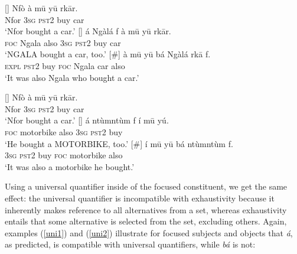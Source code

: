 \documentclass[output=paper,
modfonts
]{langscibook}
\begin{document}
\begin{exe}
\ex
\begin{xlist}
[] {{\label{also1}}
\gll Nf\`o \`a m\=u y\=u rk\=ar. \\
Nfor \textsc{3sg} \textsc{pst2} buy car\\
\glt `Nfor bought a car.'}
[]{ \label{also2}
\gll \'a Ng\`al\'a  f \`a m\=u y\=u rk\=ar. \\
\textsc{foc} Ngala also \textsc{3sg} \textsc{pst2} buy car  \\
\glt `NGALA bought a car, too.'}
[\#] {\label{also3}
\gll \`a m\=u y\=u {b\'a} Ng\`al\'a rk\=a f. \\
 \textsc{expl} \textsc{pst2} buy \textsc{foc} Ngala car also\\
\glt `It was also Ngala who bought a car.'}
\end{xlist}
\end{exe}



\begin{exe}
\ex
\begin{xlist}
[] {\label{also4} 
\gll Nf\`o \`a m\=u y\=u rk\=ar. \\
Nfor \textsc{3sg} \textsc{pst2} buy car\\
\glt `Nfor bought a car.'}
[]{ \label{also5}
\gll \'a nt\`umnt\`um  f \'i m\=u y\'u. \\
\textsc{foc} motorbike also \textsc{3sg} \textsc{pst2} buy  \\
\glt `He bought a MOTORBIKE, too.'}
[\#] {\label{also6}
\gll \'i m\=u y\=u {b\'a} nt\`umnt\`um f. \\
 \textsc{3sg} \textsc{pst2} buy \textsc{foc} motorbike also\\
\glt `It was also a motorbike he bought.'}
\end{xlist}
\end{exe}
Using a universal quantifier inside of the focused constituent, we get the same effect: the universal quantifier is incompatible with exhaustivity because it inherently makes reference to all alternatives from a set, whereas exhaustivity entails that some alternative is selected from the set, excluding others. Again, examples (\ref{uni1}) and (\ref{uni2})  illustrate for focused subjects and objects that \textit{á}, as predicted, is compatible with universal quantifiers, while \textit{bá} is not:

\ea  \label{uni1}
\settowidth{}
\z \z 
\end{document}
